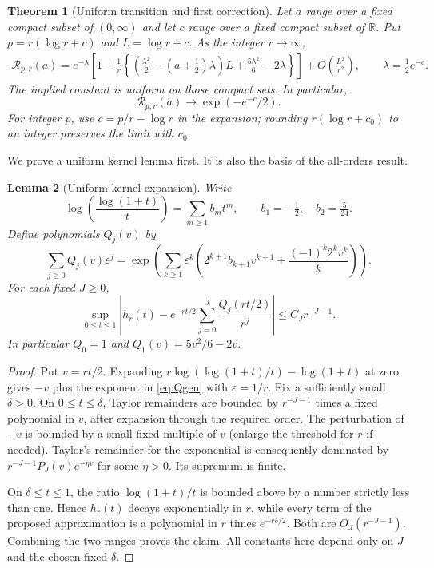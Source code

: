 \documentclass[11pt]{article}
\numberwithin{equation}{section}
\newtheorem{theorem}{Theorem}[section]
\newtheorem{lemma}[theorem]{Lemma}
\theoremstyle{definition}\newtheorem{definition}[theorem]{Definition}
\theoremstyle{remark}\newtheorem{remark}[theorem]{Remark}
\begin{document}
\begin{theorem}[Uniform transition and first correction]\label{thm:transition}
Let $a$ range over a fixed compact subset of $(0,\infty)$ and let $c$ range over a fixed compact subset of $\mathbb R$. Put $p=r(\log r+c)$ and $L=\log r+c$. As the integer $r\to\infty$,
\begin{align}\label{eq:transition}
 \mathcal R_{p,r}(a)
 =e^{-\lambda}\left[1+\frac1r
 \left\{\left(\frac{\lambda^2}{2}-(a+\tfrac12)\lambda\right)L
                  +\frac{5\lambda^2}{6}-2\lambda\right\}\right]
 +O\!\left(\frac{L^2}{r^2}\right),
 \qquad \lambda=\tfrac12e^{-c}.
\end{align}
The implied constant is uniform on those compact sets. In particular,
\begin{equation}\label{eq:profile}
 \mathcal R_{p,r}(a)\longrightarrow\exp(-e^{-c}/2).
\end{equation}
For integer $p$, use $c=p/r-\log r$ in the expansion; rounding $r(\log r+c_0)$ to an integer preserves the limit with $c_0$.
\end{theorem}

We prove a uniform kernel lemma first. It is also the basis of the all-orders result.

\begin{lemma}[Uniform kernel expansion]\label{lem:kernel}
Write
\begin{equation}\label{eq:b}
 \log\left(\frac{\log(1+t)}t\right)=\sum_{m\ge1}b_mt^m,
 \qquad b_1=-\tfrac12,\quad b_2=\tfrac5{24}.
\end{equation}
Define polynomials $Q_j(v)$ by
\begin{equation}\label{eq:Qgen}
 \sum_{j\ge0}Q_j(v)\varepsilon^j
 =\exp\left(\sum_{k\ge1}\varepsilon^k
 \left(2^{k+1}b_{k+1}v^{k+1}+\frac{(-1)^k2^kv^k}{k}\right)\right).
\end{equation}
For each fixed $J\ge0$,
\begin{equation}\label{eq:kernelExpansion}
 \sup_{0\le t\le1}\left|
 h_r(t)-e^{-rt/2}\sum_{j=0}^J\frac{Q_j(rt/2)}{r^j}\right|
 \le C_J r^{-J-1}.
\end{equation}
In particular $Q_0=1$ and $Q_1(v)=5v^2/6-2v$.
\end{lemma}
\begin{proof}
Put $v=rt/2$. Expanding $r\log(\log(1+t)/t)-\log(1+t)$ at zero gives $-v$ plus the exponent in \eqref{eq:Qgen} with $\varepsilon=1/r$. Fix a sufficiently small $\delta>0$. On $0\le t\le\delta$, Taylor remainders are bounded by $r^{-J-1}$ times a fixed polynomial in $v$, after expansion through the required order. The perturbation of $-v$ is bounded by a small fixed multiple of $v$ (enlarge the threshold for $r$ if needed). Taylor's remainder for the exponential is consequently dominated by $r^{-J-1}P_J(v)e^{-\eta v}$ for some $\eta>0$. Its supremum is finite.

On $\delta\le t\le1$, the ratio $\log(1+t)/t$ is bounded above by a number strictly less than one. Hence $h_r(t)$ decays exponentially in $r$, while every term of the proposed approximation is a polynomial in $r$ times $e^{-r\delta/2}$. Both are $O_J(r^{-J-1})$. Combining the two ranges proves the claim. All constants here depend only on $J$ and the chosen fixed $\delta$.
\end{proof}
\end{document}

